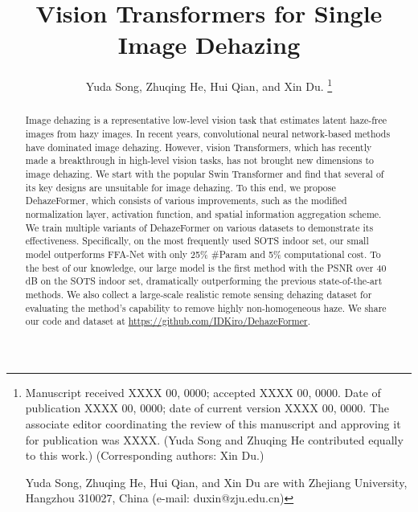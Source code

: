 \documentclass[journal]{IEEEtran}
\begin{document}
\title{Vision Transformers for Single Image Dehazing}

\author{
Yuda Song, Zhuqing He, Hui Qian, and Xin Du.
\thanks{
Manuscript received XXXX 00, 0000; accepted XXXX 00, 0000. 
Date of publication XXXX 00, 0000; date of current version XXXX 00, 0000. 
The associate editor coordinating the review of this manuscript and approving it for publication was XXXX.
(Yuda Song and Zhuqing He contributed equally to this work.) (Corresponding authors: Xin Du.)


Yuda Song, Zhuqing He, Hui Qian, and Xin Du are with Zhejiang University, Hangzhou 310027, China
(e-mail: duxin@zju.edu.cn)
}
}


\maketitle

\newcommand{\gr}{\rowcolor[gray]{.95}}
\newcommand{\rt}{\textcolor[rgb]{0.75,0.25,0.25}}
\newcommand{\bt}{\textcolor[rgb]{0.25,0.25,0.75}}

\begin{abstract}
    Image dehazing is a representative low-level vision task that estimates latent haze-free images from hazy images.
    In recent years, convolutional neural network-based methods have dominated image dehazing.
    However, vision Transformers, which has recently made a breakthrough in high-level vision tasks, has not brought new dimensions to image dehazing.
    We start with the popular Swin Transformer and find that several of its key designs are unsuitable for image dehazing.
    To this end, we propose DehazeFormer, which consists of various improvements, such as the modified normalization layer, activation function, and spatial information aggregation scheme.
    We train multiple variants of DehazeFormer on various datasets to demonstrate its effectiveness.
    Specifically, on the most frequently used SOTS indoor set, our small model outperforms FFA-Net with only 25\% \#Param and 5\% computational cost.
    To the best of our knowledge, our large model is the first method with the PSNR over 40 dB on the SOTS indoor set, dramatically outperforming the previous state-of-the-art methods.
    We also collect a large-scale realistic remote sensing dehazing dataset for evaluating the method's capability to remove highly non-homogeneous haze.
    We share our code and dataset at \href{https://github.com/IDKiro/DehazeFormer}{https://github.com/IDKiro/DehazeFormer}.
\end{abstract}
 
\end{document}
